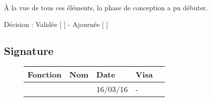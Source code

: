 \documentclass[asi, sansVersion]{picInsa}
\begin{document}
À la vue de tous ces éléments, la phase de conception a pu débuter.

\begin{center}
Décision : Validée [ \checkmark{} ] - Ajournée [ ]
\end{center}

\subsection*{Signature}
\begin{figure}[H]
		\centering
		\begin{tabularx}{17cm}{|p{4cm}|X|X|X|X|}
		\hline
		\rowcolor[gray]{0.85} Fonction & Nom & Date & Visa \\
		\hline
		\CP{} & \Sergi{} & 16/03/16 & - \\
		\hline
		\end{tabularx}
\end{figure}
\end{document}
